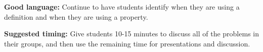 \documentclass[nooutcomes,noauthor, handout]{ximera}
\begin{document}
\begin{instructorNotes}


{\bf Good language:} Continue to have students identify when they are using a definition and when they are using a property.

{\bf Suggested timing:} Give students 10-15 minutes to discuss all of the problems in their groups, and then use the remaining time for presentations and discussion.


\end{instructorNotes}
\end{document}
